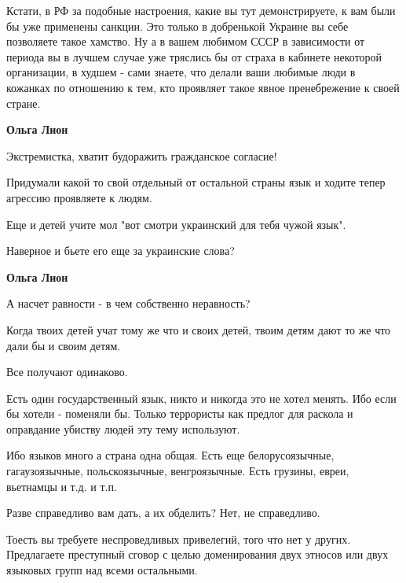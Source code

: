 \begin{itemize}
\begin{itemize}
Кстати, в РФ за подобные настроения, какие вы тут демонстрируете, к вам были бы
уже применены санкции. Это только в добренькой Украине вы себе позволяете такое
хамство. Ну а в вашем любимом СССР в зависимости от периода вы в лучшем случае
уже тряслись бы от страха в кабинете некоторой организации, в худшем - сами
знаете, что делали ваши любимые люди в кожанках по отношению к тем, кто
проявляет такое явное пренебрежение к своей стране.

 
\textbf{Ольга Лион}

Экстремистка, хватит будоражить гражданское согласие!

Придумали какой то свой отдельный от остальной страны язык и ходите тепер
агрессию проявляете к людям.

Еще и детей учите мол "вот смотри украинский для тебя чужой язык".

Наверное и бьете его еще за украинские слова?

 
\textbf{Ольга Лион}

А насчет равности - в чем собственно неравность?

Когда твоих детей учат тому же что и своих детей, твоим детям дают то же что дали бы и своим детям.

Все получают одинаково.

Есть один государственный язык, никто и никогда это не хотел менять. Ибо если
бы хотели - поменяли бы. Только террористы как предлог для раскола и оправдание
убиству людей эту тему используют.

Ибо языков много а страна одна общая. Есть еще белорусоязычные, гагаузоязычные,
польскоязычные, венгроязычные. Есть грузины, евреи, вьетнамцы и т.д. и т.п.

Разве справедливо вам дать, а их обделить? Нет, не справедливо.

Тоесть вы требуете неспроведливых привелегий, того что нет у других.
Предлагаете преступный сговор с целью доменирования двух этносов или двух
языковых групп над всеми остальными.


\end{itemize}
\end{itemize}
